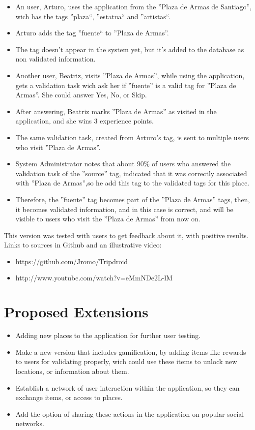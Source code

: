 \documentclass{sig-alternate}
\begin{document}
\begin{itemize}
 
 \item An user, Arturo, uses the application from the ''Plaza de Armas de Santiago'', wich has the tags ''plaza``, ''estatua`` and ''artistas``.
 \item Arturo adds the tag ''fuente`` to ''Plaza de Armas''.
 \item The tag doesn't appear in the system yet, but it's added to the database as non validated information.
 \item Another user, Beatriz, visits ''Plaza de Armas'', while using the application, gets a validation task wich ask her if ''fuente'' is a valid tag for ''Plaza de Armas''. She could answer Yes, No, or Skip.
 \item After answering, Beatriz marks ''Plaza de Armas'' as visited in the application, and she wins 3 experience points.
 \item The same validation task, created from Arturo's tag, is sent to multiple users who visit ''Plaza de Armas''.
 \item System Administrator notes that about 90\% of users who answered the validation task of the ''source'' tag, indicated that it was correctly associated with ''Plaza de Armas'',so he add this tag to the validated tags for this place.
 \item Therefore, the ''fuente'' tag becomes part of the ''Plaza de Armas'' tags, then, it becomes validated information, and in this case is correct, and will be visible to users who visit the ''Plaza de Armas'' from now on.
\end{itemize}

This version was tested with users to get feedback about it, with positive results.\\

Links to sources in Github and an illustrative video:
\begin{itemize}
\item https://github.com/Jromo/Tripdroid
\item http://www.youtube.com/watch?v=eMmNDe2L-lM
\end{itemize}

\section{Proposed Extensions}

\begin{itemize}
\item Adding new places to the application for further user testing.
   \item Make a new version that includes gamification, by adding items like rewards to users for validating properly, wich could use these items to unlock new locations, or information about them.
   \item Establish a network of user interaction within the application, so they can exchange items, or access to places.
   \item Add the option of sharing these actions in the application on popular social networks.
\end{itemize}
\end{document}
